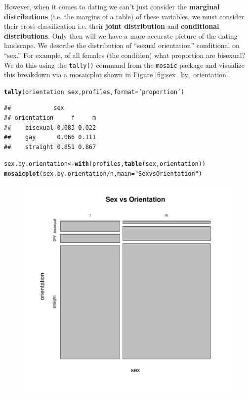 \documentclass{article}\usepackage[]{graphicx}\usepackage[]{color}
\makeatletter
\def\maxwidth{ %
  \ifdim\Gin@nat@width>\linewidth
    \linewidth
  \else
    \Gin@nat@width
  \fi
}
\newcommand{\hlstr}[1]{\textcolor[rgb]{0.192,0.494,0.8}{#1}}%
\newcommand{\hlopt}[1]{\textcolor[rgb]{0,0,0}{#1}}%
\newcommand{\hlstd}[1]{\textcolor[rgb]{0.345,0.345,0.345}{#1}}%
\newcommand{\hlkwb}[1]{\textcolor[rgb]{0.69,0.353,0.396}{#1}}%
\newcommand{\hlkwc}[1]{\textcolor[rgb]{0.333,0.667,0.333}{#1}}%
\newcommand{\hlkwd}[1]{\textcolor[rgb]{0.737,0.353,0.396}{\textbf{#1}}}%
\newenvironment{kframe}{%
 \def\at@end@of@kframe{}%
 \ifinner\ifhmode%
  \def\at@end@of@kframe{\end{minipage}}%
  \begin{minipage}{\columnwidth}%
 \fi\fi%
 \def\FrameCommand##1{\hskip\@totalleftmargin \hskip-\fboxsep
 \colorbox{shadecolor}{##1}\hskip-\fboxsep
     \hskip-\linewidth \hskip-\@totalleftmargin \hskip\columnwidth}%
 \MakeFramed {\advance\hsize-\width
   \@totalleftmargin\z@ \linewidth\hsize
   \@setminipage}}%
 {\par\unskip\endMakeFramed%
 \at@end@of@kframe}
\newenvironment{knitrout}{}{} %
\makeatother
\begin{document}
However, when it comes to dating we can't just consider the \textbf{marginal distributions} (i.e. the margins of a table) of these variables, we must consider their cross-classification i.e. their \textbf{joint distribution} and \textbf{conditional distributions}.  Only then will we have a more accurate picture of the dating landscape.  We describe the distribution of ``sexual orientation'' conditional on ``sex.''  For example, of all females (the condition) what proportion are bisexual?  We do this using the \verb#tally()# command from the \verb#mosaic# package and visualize this breakdown via a mosaicplot shown in Figure \ref{fig:sex_by_orientation}.

\begin{knitrout}
\color{fgcolor}\begin{kframe}
\begin{alltt}
\hlkwd{tally}\hlstd{(orientation} \hlopt{~} \hlstd{sex, profiles,} \hlkwc{format}\hlstd{=}\hlstr{'proportion'}\hlstd{)}
\end{alltt}
\begin{verbatim}
##            sex
## orientation     f     m
##    bisexual 0.083 0.022
##    gay      0.066 0.111
##    straight 0.851 0.867
\end{verbatim}
\begin{alltt}
\hlstd{sex.by.orientation} \hlkwb{<-} \hlkwd{with}\hlstd{(profiles,} \hlkwd{table}\hlstd{(sex, orientation))}
\hlkwd{mosaicplot}\hlstd{(sex.by.orientation}\hlopt{/}\hlstd{n,} \hlkwc{main}\hlstd{=}\hlstr{"Sex vs Orientation"}\hlstd{)}
\end{alltt}
\end{kframe}\begin{figure}

{\centering \includegraphics[width=\maxwidth]{figure/sex_by_orientation-1} 

}
\end{figure}
\end{knitrout}
\end{document}
